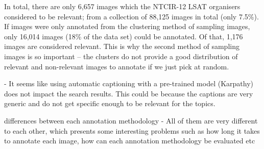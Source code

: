 In total, there are only 6,657 images which the NTCIR-12 LSAT organisers considered to be relevant; from a collection of 88,125 images in total (only 7.5\%). If images were only annotated from the clustering method of sampling images, only 16,014 images (18\% of the data set) could be annotated. Of that, 1,176 images are considered relevant. This is why the second method of sampling images is so important -- the clusters do not provide a good distribution of relevant and non-relevant images to annotate if we just pick at random.





- It seems like using automatic captioning with a pre-trained model (Karpathy) does not impact the search results. This could be because the captions are very generic and do not get specific enough to be relevant for the topics. 

differences between each annotation methodology - All of them are very different to each other, which presents some interesting problems such as how long it takes to annotate each image, how can each annotation methodology be evaluated etc


